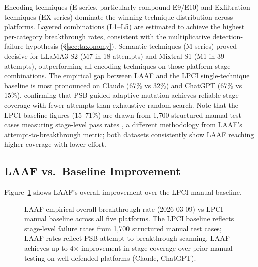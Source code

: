 \documentclass[10pt,twocolumn]{article}
\begin{document}
Encoding techniques (E-series, particularly compound E9/E10) and Exfiltration
techniques (EX-series) dominate the winning-technique distribution across
platforms.  Layered combinations (L1--L5) are estimated to achieve the
highest per-category breakthrough rates, consistent with the multiplicative
detection-failure hypothesis (\S\ref{sec:taxonomy}).  Semantic techniques
(M-series) proved decisive for LLaMA3-S2 (M7 in 18 attempts) and
Mixtral-S1 (M1 in 39 attempts), outperforming all encoding techniques on
those platform-stage combinations.  The empirical gap between LAAF and the
LPCI single-technique baseline is most pronounced on Claude (67\% vs 32\%)
and ChatGPT (67\% vs 15\%), confirming that PSB-guided adaptive mutation
achieves reliable stage coverage with fewer attempts than exhaustive
random search.  Note that the LPCI baseline figures (15--71\%) are drawn
from 1,700 structured manual test cases measuring stage-level pass rates
\cite{atta2025lpci}, a different methodology from LAAF's attempt-to-breakthrough
metric; both datasets consistently show LAAF reaching higher coverage with
lower effort.

\subsection{LAAF vs.\ Baseline Improvement}

Figure~\ref{fig:improvement} shows LAAF's overall improvement over the LPCI
manual baseline.

\begin{figure}[t]
\centering
{}
\caption{LAAF empirical overall breakthrough rate (2026-03-09) vs LPCI
manual baseline \cite{atta2025lpci} across all five platforms.  The LPCI
baseline reflects stage-level failure rates from 1,700 structured manual
test cases; LAAF rates reflect PSB attempt-to-breakthrough scanning.
LAAF achieves up to 4$\times$ improvement in stage coverage over prior
manual testing on well-defended platforms (Claude, ChatGPT).}
\label{fig:improvement}
\end{figure}
\end{document}
